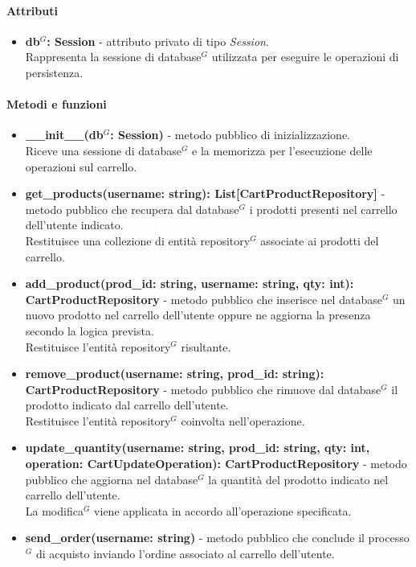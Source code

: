 \paragraph{Attributi}
\begin{itemize}
	\item \textbf{db$^G$: Session} - attributo privato di tipo \textit{Session}.\\
	Rappresenta la sessione di database$^G$ utilizzata per eseguire le operazioni di persistenza.
\end{itemize}

\paragraph{Metodi e funzioni}
\begin{itemize}
	\item \textbf{\_\_init\_\_(db$^G$: Session)} - metodo pubblico di inizializzazione.\\
	Riceve una sessione di database$^G$ e la memorizza per l'esecuzione delle operazioni sul carrello.
	\item \textbf{get\_products(username: string): List[CartProductRepository]} - metodo pubblico che recupera dal database$^G$ i prodotti presenti nel carrello dell'utente indicato.\\
	Restituisce una collezione di entit\`a repository$^G$ associate ai prodotti del carrello.
	\item \textbf{add\_product(prod\_id: string, username: string, qty: int): CartProductRepository} - metodo pubblico che inserisce nel database$^G$ un nuovo prodotto nel carrello dell'utente oppure ne aggiorna la presenza secondo la logica prevista.\\
	Restituisce l'entit\`a repository$^G$ risultante.
	\item \textbf{remove\_product(username: string, prod\_id: string): CartProductRepository} - metodo pubblico che rimuove dal database$^G$ il prodotto indicato dal carrello dell'utente.\\
	Restituisce l'entit\`a repository$^G$ coinvolta nell'operazione.
	\item \textbf{update\_quantity(username: string, prod\_id: string, qty: int, operation: CartUpdateOperation): CartProductRepository} - metodo pubblico che aggiorna nel database$^G$ la quantit\`a del prodotto indicato nel carrello dell'utente.\\
	La modifica$^G$ viene applicata in accordo all'operazione specificata.
	\item \textbf{send\_order(username: string)} - metodo pubblico che conclude il processo$^G$ di acquisto inviando l'ordine associato al carrello dell'utente.
\end{itemize}